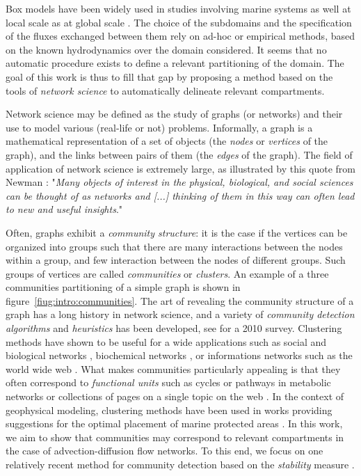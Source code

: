 Box models have been widely used in studies involving marine systems as well at local scale \cite{deleersnijder1998two,maderich2014regional,soetaert1995estimating} as at global scale \cite{kohler2005quantitative,munhoven1996glacial}. The choice of the subdomains and the specification of the fluxes exchanged between them rely on ad-hoc or empirical methods, based on the known hydrodynamics over the domain considered. It seems that no automatic procedure exists to define a relevant partitioning of the domain. The goal of this work is thus to fill that gap by proposing a method based on the tools of \textit{network science} to automatically delineate relevant compartments.

Network science may be defined as the study of graphs (or networks) and their use to model various (real-life or not) problems. Informally, a graph is a mathematical representation of a set of objects (the \textit{nodes} or \textit{vertices} of the graph), and the links between pairs of them (the \textit{edges} of the graph). The field of application of network science is extremely large, as illustrated by this quote from Newman \cite{newman2010networks}: "\textit{Many objects of interest in the physical, biological, and social sciences can be thought of as networks and [...] thinking of them in this way can often lead to new and useful insights}."

Often, graphs exhibit a \textit{community structure}: it is the case if the vertices can be organized into groups such that there are many interactions between the nodes within a group, and few interaction between the nodes of different groups. Such groups of vertices are called \textit{communities} or \textit{clusters}. An example of a three communities partitioning of a simple graph is shown in figure~\ref{fiug:intro:communities}. The art of revealing the community structure of a graph has a long history in network science, and a variety of \textit{community detection algorithms} and \textit{heuristics} has been developed, see \cite{fortunato2010community} for a 2010 survey. Clustering methods have shown to be useful for a wide applications such as social and biological networks \cite{girvan2002community}, biochemical networks \cite{holme2003subnetwork,guimera2005functional,palla2005uncovering}, or informations networks such as the world wide web \cite{flake2002self}. What makes communities particularly appealing is that they often correspond to \textit{functional units} such as cycles or pathways in metabolic networks \cite{guimera2005functional,palla2005uncovering,huss2007currency} or collections of pages on a single topic on the web \cite{flake2002self}. In the context of geophysical modeling, clustering methods have been used in works providing suggestions for the optimal placement of marine protected areas \cite{thomas2014numerical,jacobi2012identification,rossi2014hydrodynamic}. In this work, we aim to show that communities may correspond to relevant compartments in the case of advection-diffusion flow networks. To this end, we focus on one relatively recent method for community detection based on the \textit{stability} measure \cite{delvenne2010stability,delvenne2013stability,lambiotte2009laplacian}.

